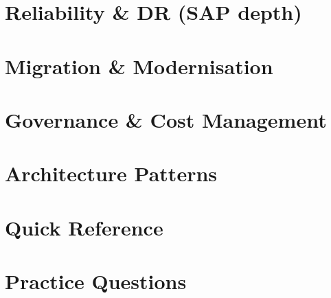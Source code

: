 \documentclass[12pt, a4paper]{article}
\begin{document}



\part{Reliability \& DR (SAP depth)}



\part{Migration \& Modernisation}



\part{Governance \& Cost Management}





\part{Architecture Patterns}



\part{Quick Reference}



\part{Practice Questions}


\end{document}
